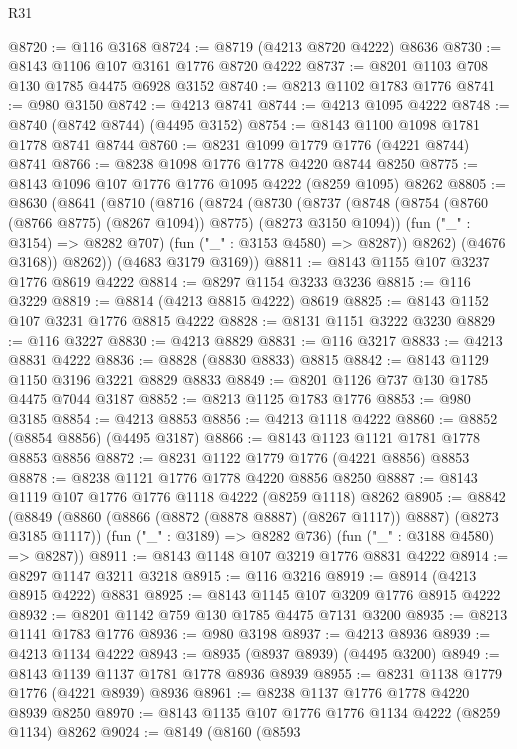 \begin{lexlean}{R31}
\begin{coremodule}
@8720 := @116 @3168
@8724 := @8719 (@4213 @8720 @4222) @8636
@8730 := @8143 @1106 @107 @3161 @1776 @8720 @4222
@8737 := @8201 @1103 @708 @130 @1785 @4475 @6928 @3152
@8740 := @8213 @1102 @1783 @1776
@8741 := @980 @3150
@8742 := @4213 @8741
@8744 := @4213 @1095 @4222
@8748 := @8740 (@8742 @8744) (@4495 @3152)
@8754 := @8143 @1100 @1098 @1781 @1778 @8741 @8744
@8760 := @8231 @1099 @1779 @1776 (@4221 @8744) @8741
@8766 := @8238 @1098 @1776 @1778 @4220 @8744 @8250
@8775 := @8143 @1096 @107 @1776 @1776 @1095 @4222 (@8259 @1095) @8262
@8805 := @8630
    (@8641
      (@8710
        (@8716
          (@8724
            (@8730
              (@8737
                (@8748 (@8754 (@8760 (@8766 @8775) (@8267 @1094)) @8775) (@8273 @3150 @1094))
                (fun ("_" : @3154) => @8282 @707)
                (fun ("_" : @3153 @4580) => @8287))
              @8262)
            (@4676 @3168))
          @8262))
      (@4683 @3179 @3169))
@8811 := @8143 @1155 @107 @3237 @1776 @8619 @4222
@8814 := @8297 @1154 @3233 @3236
@8815 := @116 @3229
@8819 := @8814 (@4213 @8815 @4222) @8619
@8825 := @8143 @1152 @107 @3231 @1776 @8815 @4222
@8828 := @8131 @1151 @3222 @3230
@8829 := @116 @3227
@8830 := @4213 @8829
@8831 := @116 @3217
@8833 := @4213 @8831 @4222
@8836 := @8828 (@8830 @8833) @8815
@8842 := @8143 @1129 @1150 @3196 @3221 @8829 @8833
@8849 := @8201 @1126 @737 @130 @1785 @4475 @7044 @3187
@8852 := @8213 @1125 @1783 @1776
@8853 := @980 @3185
@8854 := @4213 @8853
@8856 := @4213 @1118 @4222
@8860 := @8852 (@8854 @8856) (@4495 @3187)
@8866 := @8143 @1123 @1121 @1781 @1778 @8853 @8856
@8872 := @8231 @1122 @1779 @1776 (@4221 @8856) @8853
@8878 := @8238 @1121 @1776 @1778 @4220 @8856 @8250
@8887 := @8143 @1119 @107 @1776 @1776 @1118 @4222 (@8259 @1118) @8262
@8905 := @8842
    (@8849
      (@8860 (@8866 (@8872 (@8878 @8887) (@8267 @1117)) @8887) (@8273 @3185 @1117))
      (fun ("_" : @3189) => @8282 @736)
      (fun ("_" : @3188 @4580) => @8287))
@8911 := @8143 @1148 @107 @3219 @1776 @8831 @4222
@8914 := @8297 @1147 @3211 @3218
@8915 := @116 @3216
@8919 := @8914 (@4213 @8915 @4222) @8831
@8925 := @8143 @1145 @107 @3209 @1776 @8915 @4222
@8932 := @8201 @1142 @759 @130 @1785 @4475 @7131 @3200
@8935 := @8213 @1141 @1783 @1776
@8936 := @980 @3198
@8937 := @4213 @8936
@8939 := @4213 @1134 @4222
@8943 := @8935 (@8937 @8939) (@4495 @3200)
@8949 := @8143 @1139 @1137 @1781 @1778 @8936 @8939
@8955 := @8231 @1138 @1779 @1776 (@4221 @8939) @8936
@8961 := @8238 @1137 @1776 @1778 @4220 @8939 @8250
@8970 := @8143 @1135 @107 @1776 @1776 @1134 @4222 (@8259 @1134) @8262
@9024 := @8149
    (@8160
      (@8593

\end{coremodule}
\end{lexlean}
